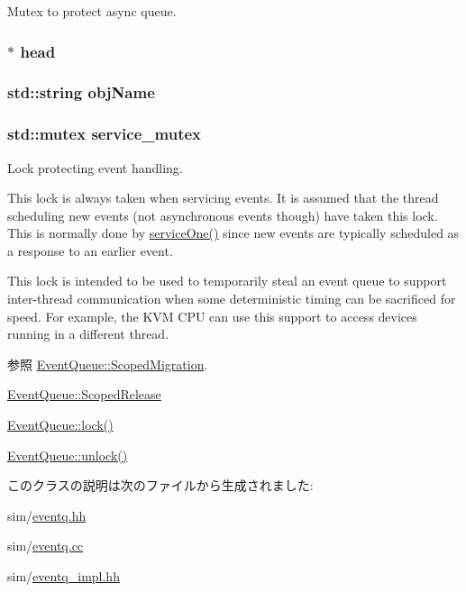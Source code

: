 Mutex to protect async queue. \hypertarget{classEventQueue_a08321f57dbffd90b5b365a6d53bb2933}{
\subsubsection[{head}]{$\ast$ {\bf head}}}
\label{classEventQueue_a08321f57dbffd90b5b365a6d53bb2933}
\hypertarget{classEventQueue_acdd07b78b47375ca2a51a7a956b1697f}{
\subsubsection[{objName}]{\setlength{\rightskip}{0pt plus 5cm}std::string {\bf objName}}}
\label{classEventQueue_acdd07b78b47375ca2a51a7a956b1697f}
\hypertarget{classEventQueue_acfc3095049c7deadb02a9eee0ec54a13}{
\subsubsection[{service\_\-mutex}]{\setlength{\rightskip}{0pt plus 5cm}std::mutex {\bf service\_\-mutex}}}
\label{classEventQueue_acfc3095049c7deadb02a9eee0ec54a13}
Lock protecting event handling.

This lock is always taken when servicing events. It is assumed that the thread scheduling new events (not asynchronous events though) have taken this lock. This is normally done by \hyperlink{classEventQueue_a95b9c78d6fb18e716e5d13362b609798}{serviceOne()} since new events are typically scheduled as a response to an earlier event.

This lock is intended to be used to temporarily steal an event queue to support inter-\/thread communication when some deterministic timing can be sacrificed for speed. For example, the KVM CPU can use this support to access devices running in a different thread.

\begin{DoxySeeAlso}{参照}
\hyperlink{classEventQueue_1_1ScopedMigration}{EventQueue::ScopedMigration}. 

\hyperlink{classEventQueue_1_1ScopedRelease}{EventQueue::ScopedRelease} 

\hyperlink{classEventQueue_aa81aed607133209dade63a226818224d}{EventQueue::lock()} 

\hyperlink{classEventQueue_a9278be8203e1c42e2619179882ae4403}{EventQueue::unlock()} 
\end{DoxySeeAlso}


このクラスの説明は次のファイルから生成されました:\begin{DoxyCompactItemize}
\item 
sim/\hyperlink{eventq_8hh}{eventq.hh}\item 
sim/\hyperlink{eventq_8cc}{eventq.cc}\item 
sim/\hyperlink{eventq__impl_8hh}{eventq\_\-impl.hh}\end{DoxyCompactItemize}
